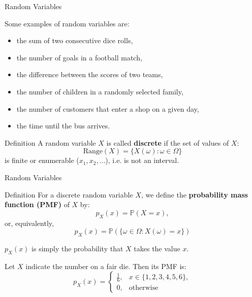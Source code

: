 \documentclass{beamer}
\newcommand{\PP}{\mathbb{P}}
\begin{document}
\begin{frame}{Random Variables}
\begin{example}
    Some examples of random variables are:
    \begin{itemize}[<+->]
        \item the sum of two consecutive dice rolls,
        \item the number of goals in a football match,
        \item the difference between the scores of two teams,
        \item the number of children in a randomly selected family,
        \item the number of customers that enter a shop on a given day,
        \item the time until the bus arrives.
    \end{itemize}
\end{example}
\pause
\begin{block}{Definition}
    A random variable \( X \) is called \textbf{discrete} if the set of values of \( X \):
    \[ \text{Range}(X) = \{X(\omega) : \omega \in \Omega\} \]
    is finite or enumerable ($x_1, x_2, \dots$), i.e. is not an interval.

\end{block}

\end{frame}



\begin{frame}{Random Variables}
    
\begin{block}{Definition}
    For a discrete random variable \( X \), we define the \textbf{probability mass function (PMF)} of \( X \) by:
\[ p_X(x)= \PP(X = x), \]
or, equivalently,
\[p_X(x)= \PP(\{\omega \in \Omega : X(\omega) = x\}) \]

\end{block}\pause
$p_X(x)$ is simply the probability that $X$ takes the value $x$.
\pause
\begin{example}
    Let $X$ indicate the number on a fair die. Then its PMF is:
    \[ 
    p_X(x)=\begin{cases}
        \frac{1}{6}, &x\in\{1,2,3,4,5,6\},\\
        0,&\text{otherwise}
    \end{cases}
    \]
\end{example}

\end{frame}
\end{document}
